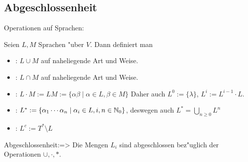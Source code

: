 \subsection{Abgeschlossenheit}
\label{sub:complete}
 Operationen auf Sprachen:{
  Seien $L, M$ Sprachen "uber $V$. Dann definiert man
  \begin{itemize}
    \item {}: $L\cup M$ auf naheliegende Art und 
      Weise.
    \item {}: $L\cap M$ auf naheliegende Art und 
      Weise.
    \item {}: 
      $L\cdot M:=LM:=\{\alpha\beta\mid\alpha\in L,\beta\in M\}$
      Daher auch $L^0:=\{\lambda\}$, $L^i:=L^{i-1}\cdot L$.
    \item {}:
      $L^*:=\{\alpha_1\cdots\alpha_n\mid \alpha_i\in L,i,n\in\mathbb N_0\}$,
      deswegen auch $L^* = \bigcup_{n \geq 0} L^n$
    \item {}:
      $L^c:=T^*\setminus L$
    \end{itemize}
  }
\theorem Abgeschlossenheit:=>{
  \label{the:complete}
  Die Mengen $L_i$ sind abgeschlossen bez"uglich der Operationen 
  $\cup, \cdot, *$.
  }
